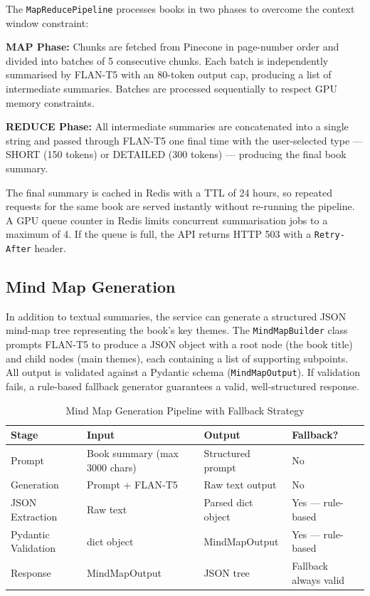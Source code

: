 The \texttt{MapReducePipeline} processes books in two phases to overcome the
context window constraint:

\textbf{MAP Phase:} Chunks are fetched from Pinecone in page-number order and
divided into batches of 5 consecutive chunks. Each batch is independently
summarised by FLAN-T5 with an 80-token output cap, producing a list of
intermediate summaries. Batches are processed sequentially to respect GPU
memory constraints.

\textbf{REDUCE Phase:} All intermediate summaries are concatenated into a
single string and passed through FLAN-T5 one final time with the user-selected
type --- SHORT (150 tokens) or DETAILED (300 tokens) --- producing the final
book summary.

The final summary is cached in Redis with a TTL of 24 hours, so repeated
requests for the same book are served instantly without re-running the
pipeline. A GPU queue counter in Redis limits concurrent summarisation jobs to
a maximum of 4. If the queue is full, the API returns HTTP 503 with a
\texttt{Retry-After} header.

\subsection{Mind Map Generation}

In addition to textual summaries, the service can generate a structured JSON
mind-map tree representing the book's key themes. The \texttt{MindMapBuilder}
class prompts FLAN-T5 to produce a JSON object with a root node (the book
title) and child nodes (main themes), each containing a list of supporting
subpoints. All output is validated against a Pydantic schema
(\texttt{MindMapOutput}). If validation fails, a rule-based fallback generator
guarantees a valid, well-structured response.

\begin{table}[H]
\centering
\caption{Mind Map Generation Pipeline with Fallback Strategy}
\label{tab:mindmap}
\begin{tabularx}{\textwidth}{|l|X|X|l|}\hline
\textbf{Stage} & \textbf{Input} & \textbf{Output} & \textbf{Fallback?} \\
\hline
Prompt              & Book summary (max 3000 chars) & Structured prompt  & No \\
\hline
Generation          & Prompt + FLAN-T5              & Raw text output    & No \\
\hline
JSON Extraction     & Raw text                      & Parsed dict object & Yes --- rule-based \\
\hline
Pydantic Validation & dict object                   & MindMapOutput      & Yes --- rule-based \\
\hline
Response            & MindMapOutput                 & JSON tree          & Fallback always valid \\
\hline
\end{tabularx}
\end{table}


